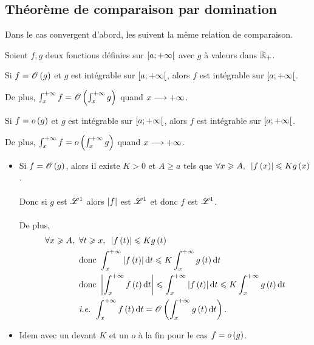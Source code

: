 \subsection{Théorème de comparaison par domination}

Dans le cas convergent d'abord, les  suivent la même relation de comparaison.

\begin{theo}
Soient \(f,g\) deux fonctions définies sur \(\left[a;+\infty\right[\) avec \(g\) à valeurs dans \(\mathbb{R}_+\).

Si \(f=\mathscr{O}\left(g\right)\) et \(g\) est intégrable sur \(\left[a;+\infty\right[\), alors \(f\) est intégrable sur \(\left[a;+\infty\right[\).

De plus, \(\int_x^{+\infty}f=\mathscr{O}\left(\int_x^{+\infty}g\right)\) quand \(x\longrightarrow+\infty\).

Si \(f=o\left(g\right)\) et \(g\) est intégrable sur \(\left[a;+\infty\right[\), alors \(f\) est intégrable sur \(\left[a;+\infty\right[\).

De plus, \(\int_x^{+\infty}f=o\left(\int_x^{+\infty}g\right)\) quand \(x\longrightarrow+\infty\).
\end{theo}

\begin{dem}
\begin{itemize}
    \item Si \(f=\mathscr{O}\left(g\right)\), alors il existe \(K>0\) et \(A\geq a\) tels que \(\quantifs{\forall x\geq A}\abs{f\paren{x}}\leq Kg\paren{x}\). \\\\ Donc si \(g\) est \(\integ{1}{}{}\) alors \(\left\lvert f\right\rvert\) est \(\integ{1}{}{}\) et donc \(f\) est \(\integ{1}{}{}\). \\\\ De plus, \[\begin{aligned}
        \quantifs{\forall x\geq A}&\quantifs{\forall t\geq x}\abs{f\paren{t}}\leq Kg\paren{t} \\
        &\text{donc }\int_x^{\pinf}\abs{f\paren{t}}\odif{t}\leq K\int_x^{\pinf}g\paren{t}\odif{t} \\
        &\text{donc }\abs{\int_x^{\pinf}f\paren{t}\odif{t}}\leq\int_x^{\pinf}\abs{f\paren{t}}\odif{t}\leq K\int_x^{\pinf}g\paren{t}\odif{t} \\
        &\text{\ie }\int_x^{\pinf}f\paren{t}\odif{t}=\O{\int_x^{\pinf}g\paren{t}\odif{t}}.
    \end{aligned}\]
    \item Idem avec un  devant \(K\) et un \(o\) à la fin pour le cas \(f=o\left(g\right)\).
\end{itemize}
\end{dem}

